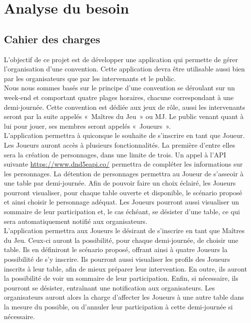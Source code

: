\documentclass[11pt]{article}
\begin{document}
\newpage


\section{Analyse du besoin}

\subsection{Cahier des charges}

L'objectif de ce projet est de développer une application qui permette de gérer l'organisation d'une convention. Cette application devra être utilisable aussi bien par les organisateurs que par les intervenants et le public.  \\

Nous nous sommes basés sur le principe d'une convention se déroulant sur un week-end et comportant quatre plages horaires, chacune correspondant à une demi-journée. Cette convention est dédiée aux jeux de rôle, aussi les intervenants seront par la suite appelés «~Maîtres du Jeu~» ou MJ. Le public venant quant à lui pour jouer, ses membres seront appelés «~Joueurs~».\\ 

L'application permettra à quiconque le souhaite de s'inscrire en tant que Joueur. Les Joueurs auront accès à plusieurs fonctionnalités. La première d'entre elles sera la création de personnages, dans une limite de trois. Un appel à l'API suivante \textcolor{blue}{\href{https://www.dnd5eapi.co/}{https://www.dnd5eapi.co/}} permettra de compléter les informations sur les personnages. La détention de personnages permettra au Joueur de s'asseoir à une table par demi-journée. Afin de pouvoir faire un choix éclairé, les Joueurs pourront visualiser, pour chaque table ouverte et disponible, le scénario proposé et ainsi choisir le personnage adéquat. Les Joueurs pourront aussi visualiser un sommaire de leur participation et, le cas échéant, se désister d'une table, ce qui sera automatiquement notifié aux organisateurs.\\

L'application permettra aux Joueurs le désirant de s'inscrire en tant que Maîtres du Jeu. Ceux-ci auront la possibilité, pour chaque demi-journée, de choisir une table.  Ils en définiront le scénario proposé, offrant ainsi à quatre Joueurs la possibilité de s'y inscrire. Ils pourront aussi visualiser les profils des Joueurs inscrits à leur table, afin de mieux préparer leur intervention. En outre, ils auront la possibilité de voir un sommaire de leur participation. Enfin, si nécessaire, ils pourront se désister, entraînant une notification aux organisateurs. Les organisateurs auront alors la charge d'affecter les Joueurs à une autre table dans la mesure du possible, ou d'annuler leur participation à cette demi-journée si nécessaire.\\
\end{document}
